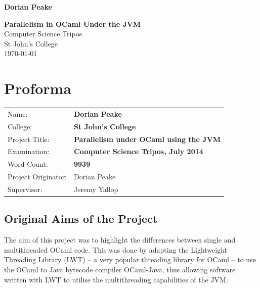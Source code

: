 \documentclass[12pt,twoside,notitlepage]{report}
\begin{document}



\pagestyle{empty}

\hfill{\LARGE \bf Dorian Peake}

\vspace*{60mm}
\begin{center}
\Huge
{\bf Parallelism in OCaml Under the JVM} \\
\vspace*{5mm}
Computer Science Tripos \\
\vspace*{5mm}
St John's College \\
\vspace*{5mm}
\today  %
\end{center}

\cleardoublepage


\setcounter{page}{1}
\pagestyle{plain}

\chapter*{Proforma}

{\large
\begin{tabular}{ll}
Name:               & \bf Dorian Peake  \\
College:            & \bf St John's College                     \\
Project Title:      & \bf Parallelism under OCaml using the JVM  \\
Examination:        & \bf Computer Science Tripos, July 2014        \\
Word Count:         & \bf 9939  \\
Project Originator: & Dorian Peake                    \\
Supervisor:         & Jeremy Yallop                   \\ 
\end{tabular}
}


\section*{Original Aims of the Project}

The aim of this project was to highlight the differences between single and multithreaded OCaml code. This was done by adapting the Lightweight Threading Library (LWT) -- a very popular threading library for OCaml -- to use the OCaml
to Java bytecode compiler OCaml-Java, thus allowing software written with LWT to utilise the multithreading capabilities of the JVM.
\end{document}
